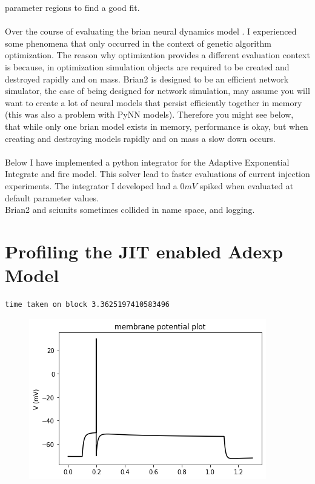 parameter regions to find a good fit.\\
\\
Over  the course of evaluating the brian neural dynamics model \cite{gerstner2014neuronal}. I experienced some phenomena that only occurred in the context of genetic algorithm optimization. The reason why optimization provides a different evaluation context is because, in optimization simulation objects are required to be created and destroyed rapidly and on mass. Brian2 is designed to be an efficient network simulator, the case of being designed for network simulation, may assume you will want to create a lot of neural models that persist efficiently together in memory (this was also a problem with PyNN models). Therefore you might see below, that while only one brian model exists in memory, performance is okay, but when creating and destroying models rapidly and on mass a slow down occurs.\\
\\
Below I have implemented a python integrator for the Adaptive
Exponential Integrate and fire model. This solver lead to faster
evaluations of current injection experiments. The integrator I developed
had a $0mV$ spiked when evaluated at default
parameter values.\\


Brian2 and sciunits sometimes collided in name space, and logging.

\section{Profiling the JIT enabled Adexp Model}
\begin{verbatim}
time taken on block 3.3625197410583496
\end{verbatim}

\begin{figure}    
\begin{center}
\includegraphics[width=0.25\linewidth]{figures/backend_check_files/backend_check_6_2.png}
\caption{}

\end{center}
\end{figure}

